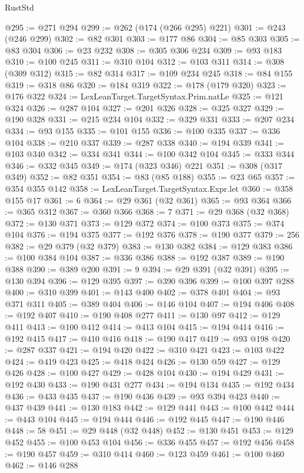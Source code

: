 \begin{lexlean}{RustStd}
\begin{coremodule}
@295 := @271 @294
@299 := @262 (@174 (@266 @295) @221)
@301 := @243 (@246 @299)
@302 := @82 @301
@303 := @177 @86
@304 := @85 @303
@305 := @83 @304
@306 := @23 @232
@308 := @305 @306 @234
@309 := @93 @183
@310 := @100 @245
@311 := @310 @104
@312 := @103 @311
@314 := @308 (@309 @312)
@315 := @82 @314
@317 := @109 @234 @245
@318 := @84 @155
@319 := @318 @86
@320 := @184 @319
@322 := @178 (@179 @320)
@323 := @176 @322
@324 := LexLeanTarget.TargetSyntax.Prim.natLe
@325 := @121 @324
@326 := @287 @104
@327 := @201 @326
@328 := @325 @327
@329 := @190 @328
@331 := @215 @234 @104
@332 := @329 @331
@333 := @207 @234
@334 := @93 @155
@335 := @101 @155
@336 := @100 @335
@337 := @336 @104
@338 := @210 @337
@339 := @287 @338
@340 := @194 @339
@341 := @103 @340
@342 := @334 @341
@344 := @100 @342 @104
@345 := @333 @344
@346 := @332 @345
@349 := @174 (@323 @346) @221
@351 := @308 (@317 @349)
@352 := @82 @351
@354 := @83 (@85 @188)
@355 := @23 @65
@357 := @354 @355 @142
@358 := LexLeanTarget.TargetSyntax.Expr.let
@360 := @358 @155 @17
@361 := 6
@364 := @29 @361 (@32 @361)
@365 := @93 @364
@366 := @365 @312
@367 := @360 @366
@368 := 7
@371 := @29 @368 (@32 @368)
@372 := @130 @371
@373 := @129 @372
@374 := @100 @373
@375 := @374 @104
@376 := @194 @375
@377 := @192 @376
@378 := @190 @377
@379 := 256
@382 := @29 @379 (@32 @379)
@383 := @130 @382
@384 := @129 @383
@386 := @100 @384 @104
@387 := @336 @386
@388 := @192 @387
@389 := @190 @388
@390 := @389 @200
@391 := 9
@394 := @29 @391 (@32 @391)
@395 := @130 @394
@396 := @129 @395
@397 := @390 @396
@399 := @100 @397 @288
@400 := @310 @399
@401 := @143 @400
@402 := @378 @401
@404 := @93 @371 @311
@405 := @389 @404
@406 := @146 @104
@407 := @194 @406
@408 := @192 @407
@410 := @190 @408 @277
@411 := @130 @97
@412 := @129 @411
@413 := @100 @412
@414 := @413 @104
@415 := @194 @414
@416 := @192 @415
@417 := @410 @416
@418 := @190 @417
@419 := @93 @198
@420 := @287 @337
@421 := @194 @420
@422 := @310 @421
@423 := @103 @422
@424 := @419 @423
@425 := @418 @424
@426 := @130 @59
@427 := @129 @426
@428 := @100 @427
@429 := @428 @104
@430 := @194 @429
@431 := @192 @430
@433 := @190 @431 @277
@434 := @194 @134
@435 := @192 @434
@436 := @433 @435
@437 := @190 @436
@439 := @93 @394 @423
@440 := @437 @439
@441 := @130 @183
@442 := @129 @441
@443 := @100 @442
@444 := @443 @104
@445 := @194 @444
@446 := @192 @445
@447 := @190 @446
@448 := 58
@451 := @29 @448 (@32 @448)
@452 := @130 @451
@453 := @129 @452
@455 := @100 @453 @104
@456 := @336 @455
@457 := @192 @456
@458 := @190 @457
@459 := @310 @414
@460 := @123 @459
@461 := @100 @460
@462 := @146 @288

\end{coremodule}
\end{lexlean}
